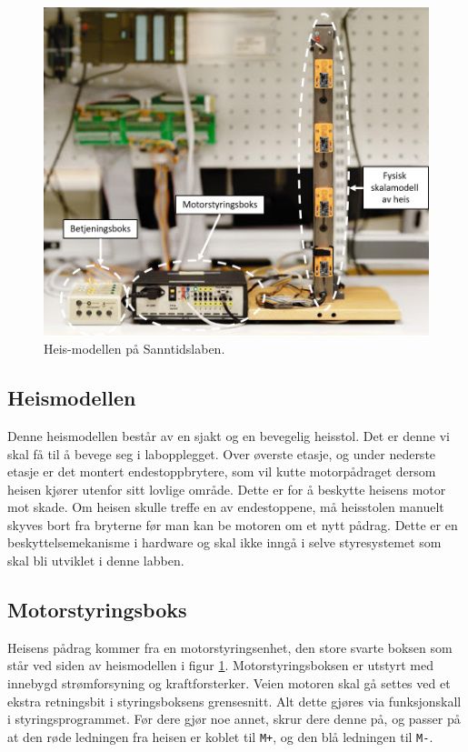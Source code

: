 \begin{alphasection}
\begin{figure}[ht!]
    \centering
    \includegraphics[scale=.85]{figures/heis.PNG}
    \caption{Heis-modellen på Sanntidslaben.}
    \label{fig:Heis-modell}
\end{figure}

\subsection{Heismodellen}

Denne heismodellen består av en sjakt og en bevegelig heisstol. Det er denne vi skal få til å bevege seg i labopplegget. Over øverste etasje, og under nederste etasje er det montert endestoppbrytere, som vil kutte motorpådraget dersom heisen kjører utenfor sitt lovlige område. Dette er for å beskytte heisens motor mot skade. Om heisen skulle treffe en av endestoppene, må heisstolen manuelt skyves bort fra bryterne før man kan be motoren om et nytt pådrag. Dette er en beskyttelsemekanisme i hardware og skal ikke inngå i selve styresystemet som skal bli utviklet i denne labben.



\subsection{Motorstyringsboks}
Heisens pådrag kommer fra en motorstyringsenhet, den store svarte boksen som står ved siden av heismodellen i figur \ref{fig:Heis-modell}. Motorstyringsboksen er utstyrt med innebygd strømforsyning og kraftforsterker. Veien motoren skal gå settes ved et ekstra retningsbit i styringsboksens grensesnitt. Alt dette gjøres via funksjonskall i styringsprogrammet. Før dere gjør noe annet, skrur dere denne på, og passer på at den røde ledningen fra heisen er koblet til \verb|M+|, og den blå ledningen til \verb|M-|.



\end{alphasection}
